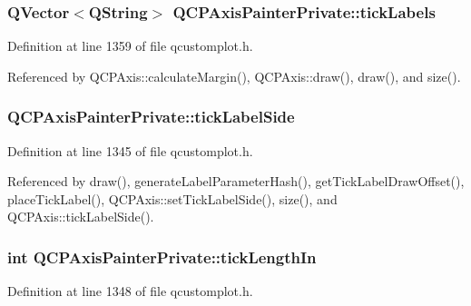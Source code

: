 \subsubsection[{tick\+Labels}]{\setlength{\rightskip}{0pt plus 5cm}Q\+Vector$<$Q\+String$>$ Q\+C\+P\+Axis\+Painter\+Private\+::tick\+Labels}\label{class_q_c_p_axis_painter_private_ad0a4998ca358ba751e84fca45a025abd}


Definition at line 1359 of file qcustomplot.\+h.



Referenced by Q\+C\+P\+Axis\+::calculate\+Margin(), Q\+C\+P\+Axis\+::draw(), draw(), and size().

\hypertarget{class_q_c_p_axis_painter_private_a9d27f7625fcfbeb3a60193d0c18fc7e9}{}
\subsubsection[{tick\+Label\+Side}]{ Q\+C\+P\+Axis\+Painter\+Private\+::tick\+Label\+Side}\label{class_q_c_p_axis_painter_private_a9d27f7625fcfbeb3a60193d0c18fc7e9}


Definition at line 1345 of file qcustomplot.\+h.



Referenced by draw(), generate\+Label\+Parameter\+Hash(), get\+Tick\+Label\+Draw\+Offset(), place\+Tick\+Label(), Q\+C\+P\+Axis\+::set\+Tick\+Label\+Side(), size(), and Q\+C\+P\+Axis\+::tick\+Label\+Side().

\hypertarget{class_q_c_p_axis_painter_private_ae7360ff805fc6097019de8b35ffbd7e7}{}
\subsubsection[{tick\+Length\+In}]{\setlength{\rightskip}{0pt plus 5cm}int Q\+C\+P\+Axis\+Painter\+Private\+::tick\+Length\+In}\label{class_q_c_p_axis_painter_private_ae7360ff805fc6097019de8b35ffbd7e7}


Definition at line 1348 of file qcustomplot.\+h.



